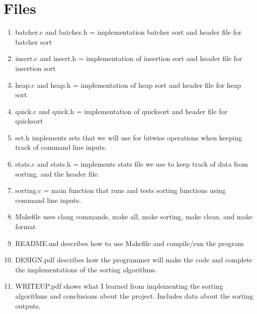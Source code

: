 \documentclass[11pt]{article}
\begin{document}
\section{Files}\label{ss:files}
\begin{enumerate}
\item batcher.c and batcher.h = implementation batcher sort and header file for batcher sort
\item insert.c and insert.h = implementation of insertion sort and header file for insertion sort
\item heap.c and heap.h = implementation of heap sort and header file for heap sort
\item quick.c and quick.h = implementation of quicksort and header file for quicksort
\item set.h implements sets that we will use for bitwise operations when keeping track of command line inputs.
\item stats.c and stats.h = implements stats file we use to keep track of data from sorting, and the header file.
\item sorting.c = main function that runs and tests sorting functions using command line inputs.
\item Makefile uses clang commands, make all, make sorting, make clean, and make format
\item README.md describes how to use Makefile and compile/run the program
\item DESIGN.pdf describes how the programmer will make the code and complete the implementations of the sorting algorithms.
\item WRITEUP.pdf shows what I learned from implementing the sorting algorithms and conclusions about the project. Includes data about the sorting outputs.
\end{enumerate}
\end{document}
